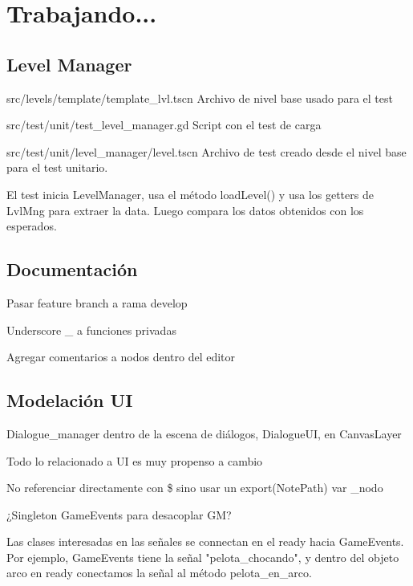 
\section{Trabajando...}\label{Trabajando}

\subsection{Level Manager}

src/levels/template/template\_lvl.tscn Archivo de nivel base usado para el test

src/test/unit/test\_level\_manager.gd Script con el test de carga

src/test/unit/level\_manager/level.tscn Archivo de test creado desde el nivel
base para el test unitario.

El test inicia LevelManager, usa el método loadLevel() y usa los getters de
LvlMng para extraer la data. Luego compara los datos obtenidos con los
esperados.


\subsection{Documentación}

Pasar feature branch a rama develop

Underscore \_ a funciones privadas

Agregar comentarios a nodos dentro del editor

\subsection{Modelación UI}

Dialogue\_manager dentro de la escena de diálogos, DialogueUI, en CanvasLayer

Todo lo relacionado a UI es muy propenso a cambio

No referenciar directamente con \$ sino usar un export(NotePath) var \_nodo

¿Singleton GameEvents para desacoplar GM?

Las clases interesadas en las señales se connectan en el ready hacia
GameEvents. Por ejemplo, GameEvents tiene la señal "pelota\_chocando", y dentro
del objeto arco en ready conectamos la señal al método pelota\_en\_arco. 

